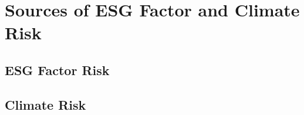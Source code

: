 \chapter{Sources of ESG Factor and Climate Risk}


\section{ESG Factor Risk}


\section{Climate Risk}